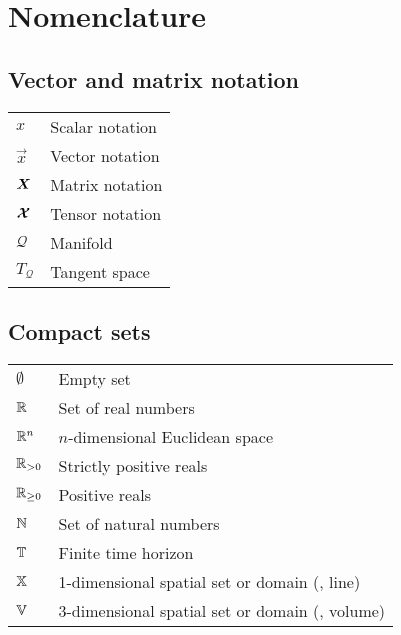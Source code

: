\newenvironment{Nomen}
    {\vspace*{-3mm}\begin{center}
    \begin{longtable}{p{.1\textwidth} p{.93\textwidth}}
    }
    {
    \end{longtable}
    \end{center}\vspace*{-1.2cm}
    }

\newcommand{\AddSymbol}[2]{#1 & #2 \\}
\chapter*{Nomenclature}

\section*{Vector and matrix notation}
\begin{Nomen}
\AddSymbol{$x$}{Scalar notation}
\AddSymbol{$\vec{x}$}{Vector notation}
\AddSymbol{$\boldsymbol{X}$}{Matrix notation}
\AddSymbol{$\boldsymbol{\mathcal{X}}$}{Tensor notation}
\AddSymbol{$\mathcal{Q}$}{Manifold}
\AddSymbol{$T_{\mathcal{Q}}$}{Tangent space}
\end{Nomen}


\section*{Compact sets}
\begin{Nomen}
\AddSymbol{$\emptyset$}{Empty set}
\AddSymbol{$\mathbb{R}$}{Set of real numbers}
\AddSymbol{$\mathbb{R}^n$}{$n$-dimensional Euclidean space}
\AddSymbol{$\mathbb{R}_{>0}$}{Strictly positive reals}
\AddSymbol{$\mathbb{R}_{\ge0}$}{Positive reals}
\AddSymbol{$\mathbb{N}$}{Set of natural numbers}
\AddSymbol{$\mathbb{T}$}{Finite time horizon}
\AddSymbol{$\mathbb{X}$}{1-dimensional spatial set or domain (\ie, line)}
\AddSymbol{$\mathbb{V}$}{3-dimensional spatial set or domain (\ie, volume)}
\end{Nomen}

